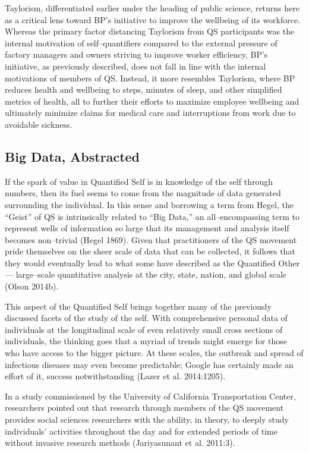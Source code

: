 \documentclass{article}
\begin{document}
Taylorism,
differentiated earlier under the heading of public science,
returns here as a critical lens toward BP's initiative to improve the wellbeing of its workforce.
Whereas the primary factor distancing Taylorism from QS participants was the internal motivation of self--quantifiers compared to the external pressure of factory managers and owners striving to improve worker efficiency,
BP's initiative,
as previously described,
does not fall in line with the internal motivations of members of QS.
Instead,
it more resembles Taylorism,
where BP reduces health and wellbeing to steps,
minutes of sleep,
and other simplified metrics of health,
all to further their efforts to maximize employee wellbeing and ultimately minimize claims for medical care and interruptions from work due to avoidable sickness.

\subsection*{Big Data, Abstracted}
If the spark of value in Quantified Self is in knowledge of the self through numbers,
then its fuel seems to come from the magnitude of data generated surrounding the individual.
In this sense and borrowing a term from Hegel,
the ``Geist'' of QS is intrinsically related to ``Big Data,'' an all--encompassing term to represent wells of information so large that its management and analysis itself becomes non--trivial
(Hegel 1869).
Given that practitioners of the QS movement pride themselves on the sheer scale of data that can be collected,
it follows that they would eventually lead to what some have described as the Quantified Other
--- large--scale quantitative analysis at the city,
state,
nation,
and global scale
(Olson 2014b).

This aspect of the Quantified Self brings together many of the previously discussed facets of the study of the self.
With comprehensive personal data of individuals at the longitudinal scale of even relatively small cross sections of individuals,
the thinking goes that a myriad of trends might emerge for those who have access to the bigger picture.
At these scales,
the outbreak and spread of infectious diseases may even become predictable;
Google has certainly made an effort of it,
success notwithstanding
(Lazer et al. 2014:1205).

In a study commissioned by the University of California Transportation Center,
researchers pointed out that research through members of the QS movement provides social sciences researchers with the ability,
in theory,
to deeply study individuals' activities throughout the day and for extended periods of time without invasive research methods (Jariyasunant et al.
2011:3).
\end{document}
